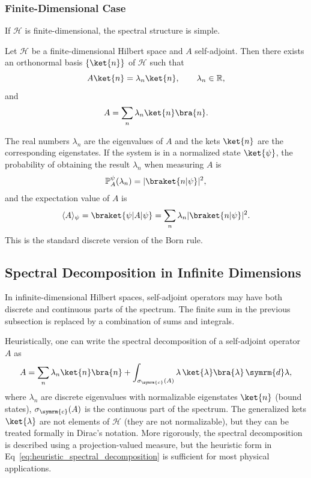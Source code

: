 \subsubsection*{Finite-Dimensional Case}\label{sec:finite_dimensional_case}
If $\mathcal{H}$ is finite-dimensional, the spectral structure is simple.
\begin{theorem}
Let $\mathcal{H}$ be a finite-dimensional Hilbert space and $A$ self-adjoint. Then there exists an orthonormal basis $\{\ket{n}\}$ of $\mathcal{H}$ such that
\begin{equation}
A\ket{n}=\lambda_n\ket{n},\qquad\lambda_n\in\mathbb{R},
\end{equation}
and
\begin{equation}
A=\sum_n\lambda_n\ket{n}\bra{n}.
\end{equation}
\end{theorem}
The real numbers $\lambda_n$ are the eigenvalues of $A$ and the kets $\ket{n}$ are the corresponding eigenstates. If the system is in a normalized state $\ket{\psi}$, the probability of obtaining the result $\lambda_n$ when measuring $A$ is
\begin{equation}
\mathbb P_A^\psi(\lambda_n)=\lvert\braket{n\vert\psi}\rvert^2,
\end{equation}
and the expectation value of $A$ is
\begin{equation}
\langle A\rangle_\psi=\braket{\psi\vert A\vert\psi}=\sum_n\lambda_n\lvert\braket{n\vert\psi}\rvert^2.
\end{equation}
This is the standard discrete version of the Born rule.
\subsection{Spectral Decomposition in Infinite Dimensions}\label{sec:spectral_decompositions_in_infinite_dimenstions}
In infinite-dimensional Hilbert spaces, self-adjoint operators may have both discrete and continuous parts of the spectrum. The finite sum in the previous subsection is replaced by a combination of sums and integrals.

Heuristically, one can write the spectral decomposition of a self-adjoint operator $A$ as
\begin{equation}\label{eq:heuristic_spectral_decomposition}
A=\sum_n \lambda_n \ket{n}\bra{n}+\int_{\sigma_{\symrm{c}}(A)} \lambda\,\ket{\lambda}\bra{\lambda}\,\symrm{d}\lambda,
\end{equation}
where $\lambda_n$ are discrete eigenvalues with normalizable eigenstates $\ket{n}$ (bound states), $\sigma_{\symrm{c}}(A)$ is the continuous part of the spectrum. The generalized kets $\ket{\lambda}$ are not elements of $\mathcal{H}$ (they are not normalizable), but they can be treated formally in Dirac’s notation. More rigorously, the spectral decomposition is described using a projection-valued measure, but the heuristic form in Eq~\eqref{eq:heuristic_spectral_decomposition} is sufficient for most physical applications.

